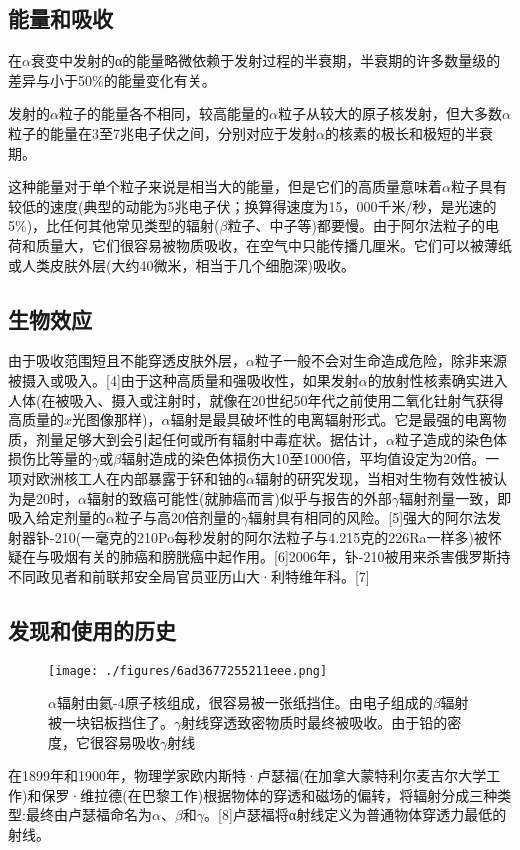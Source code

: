 \subsection{能量和吸收}
在$\alpha$衰变中发射的α的能量略微依赖于发射过程的半衰期，半衰期的许多数量级的差异与小于50\%的能量变化有关。

发射的$\alpha$粒子的能量各不相同，较高能量的$\alpha$粒子从较大的原子核发射，但大多数$\alpha$粒子的能量在3至7兆电子伏之间，分别对应于发射$\alpha$的核素的极长和极短的半衰期。

这种能量对于单个粒子来说是相当大的能量，但是它们的高质量意味着$\alpha$粒子具有较低的速度(典型的动能为5兆电子伏；换算得速度为15，000千米/秒，是光速的5\%)，比任何其他常见类型的辐射($\beta$粒子、中子等)都要慢。由于阿尔法粒子的电荷和质量大，它们很容易被物质吸收，在空气中只能传播几厘米。它们可以被薄纸或人类皮肤外层(大约40微米，相当于几个细胞深)吸收。

\subsection{生物效应}
由于吸收范围短且不能穿透皮肤外层，$\alpha$粒子一般不会对生命造成危险，除非来源被摄入或吸入。[4]由于这种高质量和强吸收性，如果发射$\alpha$的放射性核素确实进入人体(在被吸入、摄入或注射时，就像在20世纪50年代之前使用二氧化钍射气获得高质量的$x$光图像那样)，$\alpha$辐射是最具破坏性的电离辐射形式。它是最强的电离物质，剂量足够大到会引起任何或所有辐射中毒症状。据估计，$\alpha$粒子造成的染色体损伤比等量的$\gamma$或$\beta$辐射造成的染色体损伤大10至1000倍，平均值设定为20倍。一项对欧洲核工人在内部暴露于钚和铀的$\alpha$辐射的研究发现，当相对生物有效性被认为是20时，$\alpha$辐射的致癌可能性(就肺癌而言)似乎与报告的外部$\gamma$辐射剂量一致，即吸入给定剂量的$\alpha$粒子与高20倍剂量的$\gamma$辐射具有相同的风险。[5]强大的阿尔法发射器钋-210(一毫克的210Po每秒发射的阿尔法粒子与4.215克的226Ra一样多)被怀疑在与吸烟有关的肺癌和膀胱癌中起作用。[6]2006年，钋-210被用来杀害俄罗斯持不同政见者和前联邦安全局官员亚历山大·利特维年科。[7]

\subsection{发现和使用的历史}
\begin{figure}[ht]
\centering
\texttt{[image: ./figures/6ad3677255211eee.png]}
\caption{$\alpha$辐射由氦-4原子核组成，很容易被一张纸挡住。由电子组成的$\beta$辐射被一块铝板挡住了。$\gamma$射线穿透致密物质时最终被吸收。由于铅的密度，它很容易吸收$\gamma$射线} \label{fig_ALZ_3}
\end{figure}
在1899年和1900年，物理学家欧内斯特·卢瑟福(在加拿大蒙特利尔麦吉尔大学工作)和保罗·维拉德(在巴黎工作)根据物体的穿透和磁场的偏转，将辐射分成三种类型:最终由卢瑟福命名为$\alpha$、$\beta$和$\gamma$。[8]卢瑟福将α射线定义为普通物体穿透力最低的射线。

